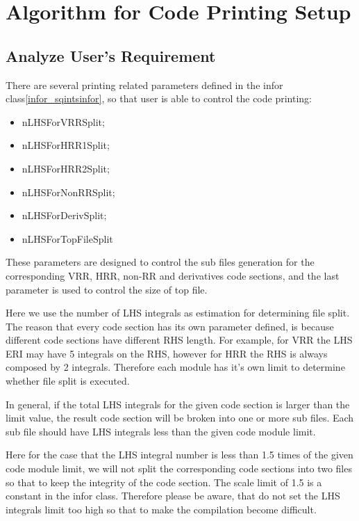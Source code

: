 \section{Algorithm for Code Printing Setup}

\subsection{Analyze User's Requirement}
\label{code_generation_user}

There are several printing related parameters defined in the infor class\ref{infor_sqintsinfor}, 
so that user is able to control the code printing:
\begin{itemize}
 \item nLHSForVRRSplit;
 \item nLHSForHRR1Split;
  \item nLHSForHRR2Split;
 \item nLHSForNonRRSplit;
 \item nLHSForDerivSplit;
 \item nLHSForTopFileSplit
\end{itemize}
These parameters are designed to control the sub files generation 
for the corresponding VRR, HRR, non-RR and derivatives code sections, and the last
parameter is used to control the size of top file.

Here we use the number of LHS integrals as estimation for determining file split.
The reason that every code section has its own parameter defined, is because
different code sections have different RHS length. For example, for VRR the 
LHS ERI may have 5 integrals on the RHS, however for HRR the RHS is always
composed by 2 integrals. Therefore each module has it's own limit to determine
whether file split is executed.

In general, if the total LHS integrals for the given code section is larger 
than the limit value, the result code section will be broken into one or more sub files.
Each sub file should have LHS integrals less than the given code module limit.

Here for the case that the LHS integral number is less than 1.5 times of the given
code module limit, we will not split the corresponding code sections into two files
so that to keep the integrity of the code section. The scale limit of 1.5 is a 
constant in the infor class. Therefore please be aware, that do not set the 
LHS integrals limit too high so that to make the compilation become difficult.

